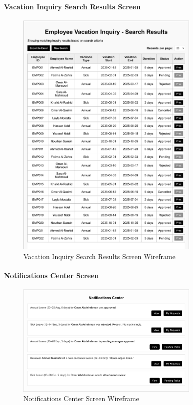\documentclass[12pt,a4paper]{article}
\begin{document}
\paragraph{Vacation Inquiry Search Results Screen}
\begin{figure}[H]
\centering
\includegraphics[width=0.8\textwidth]{Wireframes/Employee-Vacation-Inquiry-Search-Results/Employee-Vacation-Inquiry-Search-Results-1.png}
\caption{Vacation Inquiry Search Results Screen Wireframe}
\label{fig:wireframe-inquiry-search-results}
\end{figure}

\paragraph{Notifications Center Screen}
\begin{figure}[H]
\centering
\includegraphics[width=0.8\textwidth]{Wireframes/Notifications-Center/Notifications-Center-1.png}
\caption{Notifications Center Screen Wireframe}
\label{fig:wireframe-notifications-center}
\end{figure}
\end{document}
